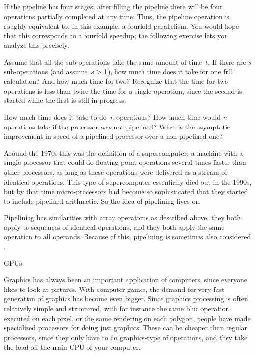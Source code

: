 If the pipeline has four stages, after filling the pipeline there will
be four operations partially completed at any time. Thus, the pipeline
operation is roughly equivalent to, in this example, a fourfold
parallelism. You would hope that this corresponds to a fourfold speedup; 
the following exercise lets you analyze this precisely.
\begin{exercise}
  Assume that all the sub-operations take the same amount of
  time~$t$. If there are $s$ sub-operations (and
  assume~$s>\nobreak1$), how much time does it take for one full
  calculation? And how much time for two? Recognize that the time
  for two operations is less than twice the time for a single operation,
  since the second is started while the first is still in progress.

  How much time does it take to do~$n$ operations? How much
  time would $n$ operations take if the processor was not pipelined?
  What is the asymptotic improvement in speed of a pipelined processor
  over a non-pipelined one?
\end{exercise}

Around the 1970s this was the definition of a supercomputer: a machine
with a single processor that could do floating point operations
several times faster than other processors, as long as these
operations were delivered as a stream of identical operations. This
type of supercomputer essentially died out in the 1990s, but by that
time micro-processors had become so sophisticated that they started to
include pipelined arithmetic. So the idea of pipelining lives on.

Pipelining has similarities with array operations as described above:
they both apply to sequences of identical operations, and they both
apply the same operation to all operands. Because of this, pipelining
is sometimes also considered .

 {GPUs}
\label{sec:gpu}

Graphics has always been an important application of computers, since
everyone likes to look at pictures. With computer games, the demand
for very fast generation of graphics has become even bigger. 
Since graphics processing is often relatively simple and structured, with 
for instance the same
blur operation executed on each pixel, or the same rendering on each polygon,
people have made specialized processors for doing just graphics. These can be
cheaper than regular processors, since they only have to do graphics-type
of operations, and they take the load off the main CPU of your computer.

